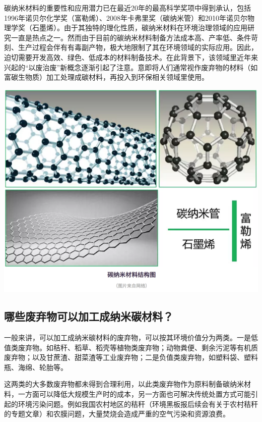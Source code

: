 \documentclass[
]{book}
\begin{document}
碳纳米材料的重要性和应用潜力已在最近20年的最高科学奖项中得到承认，包括1996年诺贝尔化学奖（富勒烯）、2008年卡弗里奖（碳纳米管）和2010年诺贝尔物理学奖（石墨烯）。由于其独特的理化性质，碳纳米材料在环境治理领域的应用研究一直是热点之一。然而由于目前的碳纳米材料制备方法成本高、产率低、条件苛刻、生产过程会伴有有毒副产物，极大地限制了其在环境领域的实际应用。因此，迫切需要开发高效、绿色、低成本的材料制备技术。在此背景下，该领域里近年来兴起的``以废治废''新概念逐渐引起了注意。意即将人们通常视作废弃物的材料（如富碳生物质）加工处理成碳材料，再投入到环保相关领域里使用。

\includegraphics[width=8.33in]{images/nano1}

\hypertarget{ux54eaux4e9bux5e9fux5f03ux7269ux53efux4ee5ux52a0ux5de5ux6210ux7eb3ux7c73ux78b3ux6750ux6599}{%
\subsection{哪些废弃物可以加工成纳米碳材料？}\label{ux54eaux4e9bux5e9fux5f03ux7269ux53efux4ee5ux52a0ux5de5ux6210ux7eb3ux7c73ux78b3ux6750ux6599}}

一般来讲，可以加工成纳米碳材料的废弃物，可以按其环境价值分为两类。一是低值类废弃物。如秸秆、稻草、稻壳等植物类废弃物；动物粪便、剩余污泥等有机质废弃物；以及甘蔗渣、甜菜渣等工业废弃物；二是负值类废弃物，如塑料袋、塑料瓶、海绵、轮胎等。

这两类的大多数废弃物都未得到合理利用，以此类废弃物作为原料制备碳纳米材料，一方面可以降低大规模生产时的成本，另一方面也可解决传统处置方式可能引起的环境污染问题。例如我国农村地区的秸秆（环境黑板报后续会有关于农村秸秆的专题文章）和农膜问题，大量焚烧会造成严重的空气污染和资源浪费。
\end{document}
